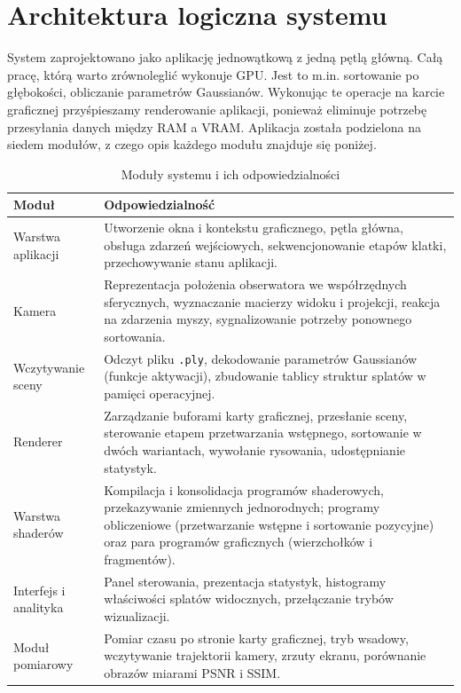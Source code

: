 \section{Architektura logiczna systemu}
\label{sec:architektura}

System zaprojektowano jako aplikację jednowątkową z jedną pętlą główną. Całą pracę, którą warto zrównoleglić wykonuje GPU. Jest to m.in. sortowanie po głębokości, obliczanie parametrów Gaussianów. Wykonując te operacje na karcie graficznej przyśpieszamy renderowanie aplikacji, ponieważ eliminuje potrzebę przesyłania danych między RAM a VRAM. Aplikacja została podzielona na siedem modułów, z czego opis każdego modułu znajduje się poniżej.
\begin{table}[htbp]
  \centering
  \caption{Moduły systemu i ich odpowiedzialności}
  \label{tab:moduly}
  \small
  \renewcommand{\arraystretch}{1.15}
  \begin{tabularx}{\textwidth}{
      >{\raggedright\arraybackslash}p{}
      >{\raggedright\arraybackslash}X}
    \toprule
    \textbf{Moduł} & \textbf{Odpowiedzialność} \\
    \midrule
    Warstwa aplikacji & Utworzenie okna i kontekstu graficznego, pętla
      główna, obsługa zdarzeń wejściowych, sekwencjonowanie etapów klatki,
      przechowywanie stanu aplikacji. \\
    Kamera & Reprezentacja położenia obserwatora we współrzędnych
      sferycznych, wyznaczanie macierzy widoku i projekcji, reakcja na
      zdarzenia myszy, sygnalizowanie potrzeby ponownego sortowania. \\
    Wczytywanie sceny & Odczyt pliku \texttt{.ply}, dekodowanie parametrów
      Gaussianów (funkcje aktywacji), zbudowanie tablicy struktur splatów
      w pamięci operacyjnej. \\
    Renderer & Zarządzanie buforami karty graficznej, przesłanie sceny,
      sterowanie etapem przetwarzania wstępnego, sortowanie w dwóch
      wariantach, wywołanie rysowania, udostępnianie statystyk. \\
    Warstwa shaderów & Kompilacja i konsolidacja programów shaderowych,
      przekazywanie zmiennych jednorodnych; programy obliczeniowe
      (przetwarzanie wstępne i sortowanie pozycyjne) oraz para programów
      graficznych (wierzchołków i fragmentów). \\
    Interfejs i analityka & Panel sterowania, prezentacja statystyk,
      histogramy właściwości splatów widocznych, przełączanie trybów
      wizualizacji. \\
    Moduł pomiarowy & Pomiar czasu po stronie karty graficznej, tryb
      wsadowy, wczytywanie trajektorii kamery, zrzuty ekranu, porównanie
      obrazów miarami PSNR i SSIM. \\
    \bottomrule
  \end{tabularx}
\end{table}
